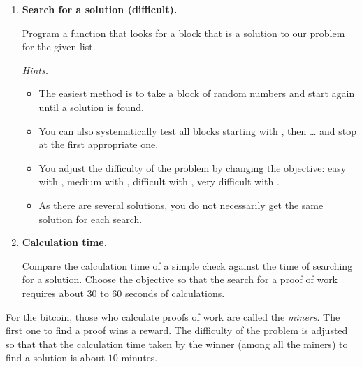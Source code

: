 \documentclass[11pt,class=report,crop=false]{standalone}
\begin{document}
\begin{activite}
\begin{enumerate}
  \item \textbf{Search for a solution (difficult).}
  
  Program a  function that looks for a  block that is a solution to our problem for the given list. 
  
  
  \emph{Hints.}
  
  \begin{itemize}
    \item The easiest method is to take a  block of random numbers and start again until a solution is found.
    
    \item You can also systematically test all blocks starting with \ci{[0,0,0,0,0,0]}, then \ci{[0,0,0,0,0,1]}\ldots{} and stop at the first appropriate one.
    
    \item You adjust the difficulty of the problem by changing the objective: easy with , medium with , difficult with , very difficult with .
    
    \item As there are several solutions, you do not necessarily get the same solution for each search. 
    
   \end{itemize}
   
   \item \textbf{Calculation time.}
   
   Compare the calculation time of a simple check against the time of searching for a solution. Choose the  objective so that the search for a proof of work requires about 30 to 60 seconds of calculations.
  
\end{enumerate}  

For the bitcoin, those who calculate proofs of work are called the \emph{miners}. The first one to find a proof wins a reward. The difficulty of the problem is adjusted so that that the calculation time taken by the winner (among all the miners) to find a solution is about $10$ minutes.

\end{activite}


\end{document}
